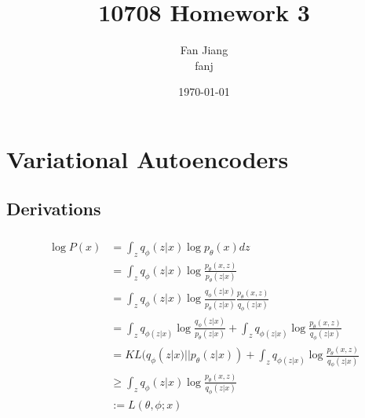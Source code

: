 \documentclass{article}
\begin{document}
\title{10708 Homework 3}
\author{Fan Jiang  \\fanj}
\date{\today{}}
\maketitle{}

\newcommand\tab[1][1cm]{\hspace*{#1}}

\section{Variational Autoencoders}

\subsection{Derivations}

\subsubsection{}
\begin{align*}
	\log P(x) &= \int_z q_{\phi}(z|x)\log p_{\theta}(x) dz \\
	&= \int_z q_{\phi} (z|x) \log \frac{p_{\theta}(x,z)}{p_{\theta}(z|x)} \\
	&= \int_z q_{\phi} (z|x) \log \frac{q_{\phi}(z|x)}{p_{\theta}(z|x)}\frac{p_{\theta}(x,z)}{q_{\phi}(z|x)} \\
	&= \int_z q_{\phi(z|x)}\log\frac{q_{\phi}(z|x)}{p_{\theta}(z|x)} + \int_z q_{\phi(z|x)}\log\frac{p_{\theta}(x,z)}{q_{\phi}(z|x)} \\
	&= KL(q_{\phi}(z|x) || p_{\theta}(z|x)) + \int_z q_{\phi(z|x)}\log\frac{p_{\theta}(x,z)}{q_{\phi}(z|x)} \\
	&\ge \int_z q_{\phi}(z|x)\log\frac{p_{\theta}(x,z)}{q_{\phi}(z|x)} \\
	&:= L(\theta, \phi; x)
\end{align*}
\end{document}
